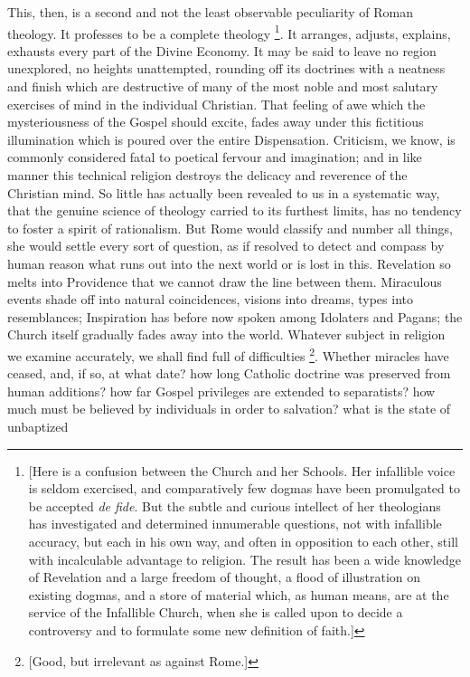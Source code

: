 This, then, is a second and not the least observable peculiarity of
Roman theology. It professes to be a complete theology \footnote{[Here is a confusion between the Church
and her Schools. Her infallible voice is seldom exercised, and
comparatively few dogmas have been promulgated to be accepted \emph{de
fide}. But the subtle and curious intellect of her theologians has
investigated and determined innumerable questions, not with infallible
accuracy, but each in his own way, and often in opposition to each
other, still with incalculable advantage to religion. The result has
been a wide knowledge of Revelation and a large freedom of thought, a
flood of illustration on existing dogmas, and a store of material
which, as human means, are at the service of the Infallible Church,
when she is called upon to decide a controversy and to formulate some
new definition of faith.]}. It arranges, adjusts, explains, exhausts every part of the
Divine Economy. It may be said to leave no region unexplored, no
heights unattempted, rounding off its doctrines with a neatness and
finish which are destructive of many of the most noble and most
salutary exercises of mind in the individual Christian. That feeling
of awe which the mysteriousness of the Gospel should excite, fades
away under this fictitious illumination which is poured over the
entire Dispensation. Criticism, we know, is commonly considered fatal
to poetical fervour and imagination; and in like manner this technical
religion destroys the delicacy and reverence of the Christian mind. So
little has actually been revealed to us in a systematic way, that the
genuine science of theology carried to its furthest limits, has
no tendency to foster a spirit of rationalism. But Rome would classify
and number all things, she would settle every sort of question, as if
resolved to detect and compass by human reason what runs out into the
next world or is lost in this. Revelation so melts into Providence
that we cannot draw the line between them. Miraculous events shade off
into natural coincidences, visions into dreams, types into
resemblances; Inspiration has before now spoken among Idolaters and
Pagans; the Church itself gradually fades away into the world.
Whatever subject in religion we examine accurately, we shall find full
of difficulties \footnote{[Good, but irrelevant as against Rome.]}.
Whether miracles have ceased, and, if so, at what date? how long
Catholic doctrine was preserved from human additions? how far Gospel
privileges are extended to separatists? how much must be believed by
individuals in order to salvation? what is the state of unbaptized
